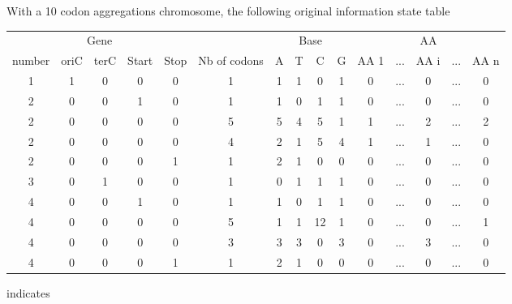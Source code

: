 \medskip

With a 10 codon aggregations chromosome, the following original information state table
\begin{center}
\footnotesize
  \begin{tabular}{|ccccc|c|cccc|ccccc|}
    \hline
    \multicolumn{5}{|c|}{Gene} &  & \multicolumn{4}{|c|}{Base} & \multicolumn{5}{|c|}{AA} \\
    number & oriC & terC & Start & Stop & Nb of codons & A & T & C & G & AA 1 & ... & AA i & ... & AA n \\
    \hline
     1  &   1  &   0  &  0    &   0  & 1 &    1   &    1   &    0   &    1   &   0  & ... &  0   & ... &  0 \\
     2  &   0  &   0  &  1    &   0  & 1 &    1   &    0   &    1   &    1   &   0  & ... &  0   & ... &  0 \\
     2  &   0  &   0  &  0    &   0  & 5 &    5   &    4   &    5   &    1   &   1  & ... &  2   & ... &  2 \\
     2  &   0  &   0  &  0    &   0  & 4 &    2   &    1   &    5   &    4   &   1  & ... &  1   & ... &  0 \\
     2  &   0  &   0  &  0    &   1  & 1 &    2   &    1   &    0   &    0   &   0  & ... &  0   & ... &  0 \\
     3  &   0  &   1  &  0    &   0  & 1 &    0   &    1   &    1   &    1   &   0  & ... &  0   & ... &  0 \\
     4  &   0  &   0  &  1    &   0  & 1 &    1   &    0   &    1   &    1   &   0  & ... &  0   & ... &  0 \\
     4  &   0  &   0  &  0    &   0  & 5 &    1   &    1   &   12   &    1   &   0  & ... &  0   & ... &  1 \\
     4  &   0  &   0  &  0    &   0  & 3 &    3   &    3   &    0   &    3   &   0  & ... &  3   & ... &  0 \\
     4  &   0  &   0  &  0    &   1  & 1 &    2   &    1   &    0   &    0   &   0  & ... &  0   & ... &  0 \\
    \hline
  \end{tabular}
\end{center}
indicates
